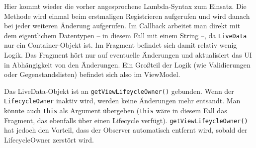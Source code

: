 \begin{Shaded}
\begin{Highlighting}[]
 
      \NormalTok{(} 

 \NormalTok{(}\NormalTok{);}

\NormalTok{(}\NormalTok{(),}
\NormalTok{         \});}
\NormalTok{\}}
\end{Highlighting}
\end{Shaded}

Hier kommt wieder die vorher angesprochene Lambda-Syntax zum Einsatz.
Die Methode wird einmal beim erstmaligen Registrieren aufgerufen und
wird danach bei jeder weiteren Änderung aufgerufen. Im Callback arbeitet
man direkt mit dem eigentlichem Datentypen -- in diesem Fall mit einem
String --, da \texttt{LiveData} nur ein Container-Objekt ist. Im
Fragment befindet sich damit relativ wenig Logik. Das Fragment hört nur
auf eventuelle Änderungen und aktualisiert das UI in Abhängigkeit von
den Änderungen. Ein Großteil der Logik (wie \zB Validierungen oder
Gegenstandslisten) befindet sich also im ViewModel.

Das LiveData-Objekt ist an \texttt{getViewLifeycleOwner()} gebunden.
Wenn der \texttt{LifecycleOwner} inaktiv wird, werden keine Änderungen
mehr entsandt. Man könnte auch \texttt{this} als Argument übergeben
(\texttt{this} wäre in diesem Fall das Fragment, das ebenfalls über
einen Lifecycle verfügt). \texttt{getViewLifeycleOwner()} hat jedoch den
Vorteil, dass der Observer automatisch entfernt wird, sobald der
LifecycleOwner zerstört wird.

